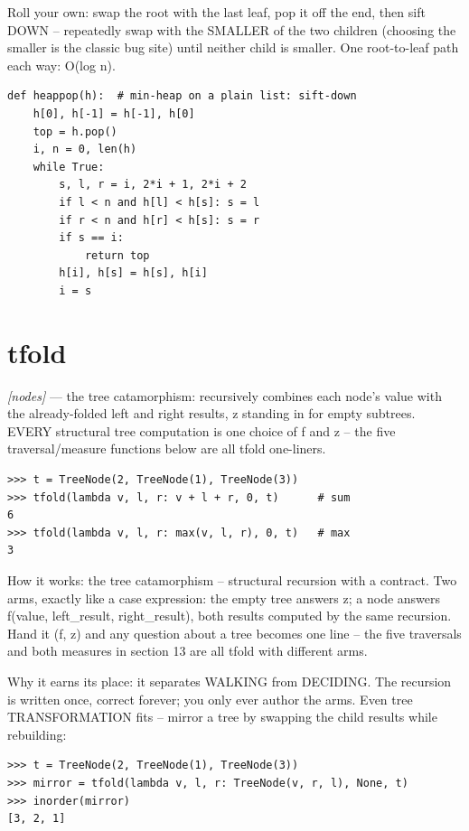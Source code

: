 \documentclass[11pt,letterpaper]{book}
\begin{document}
Roll your own: swap the root with the last leaf, pop it off the end, then sift DOWN -- repeatedly swap with the SMALLER of the two children (choosing the smaller is the classic bug site) until neither child is smaller. One root-to-leaf path each way: O(log n).

\begin{lstlisting}[style=code]
def heappop(h):  # min-heap on a plain list: sift-down
    h[0], h[-1] = h[-1], h[0]
    top = h.pop()
    i, n = 0, len(h)
    while True:
        s, l, r = i, 2*i + 1, 2*i + 2
        if l < n and h[l] < h[s]: s = l
        if r < n and h[r] < h[s]: s = r
        if s == i:
            return top
        h[i], h[s] = h[s], h[i]
        i = s
\end{lstlisting}

\section{tfold}
\noindent\textit{[nodes]} --- the tree catamorphism: recursively combines each node's value with the already-folded left and right results, z standing in for empty subtrees. EVERY structural tree computation is one choice of f and z -- the five traversal/measure functions below are all tfold one-liners.
\begin{lstlisting}[style=spec]
>>> t = TreeNode(2, TreeNode(1), TreeNode(3))
>>> tfold(lambda v, l, r: v + l + r, 0, t)      # sum
6
>>> tfold(lambda v, l, r: max(v, l, r), 0, t)   # max
3
\end{lstlisting}

How it works: the tree catamorphism -- structural recursion with a contract. Two arms, exactly like a case expression: the empty tree answers z; a node answers f(value, left\_result, right\_result), both results computed by the same recursion. Hand it (f, z) and any question about a tree becomes one line -- the five traversals and both measures in section 13 are all tfold with different arms.


Why it earns its place: it separates WALKING from DECIDING. The recursion is written once, correct forever; you only ever author the arms. Even tree TRANSFORMATION fits -- mirror a tree by swapping the child results while rebuilding:

\begin{lstlisting}[style=spec]
>>> t = TreeNode(2, TreeNode(1), TreeNode(3))
>>> mirror = tfold(lambda v, l, r: TreeNode(v, r, l), None, t)
>>> inorder(mirror)
[3, 2, 1]
\end{lstlisting}
\end{document}
